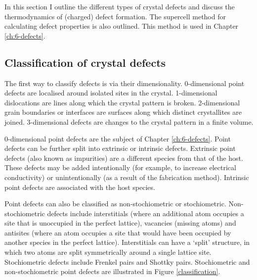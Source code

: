 In this section I outline the different types of crystal defects and discuss the thermodynamics of (charged) defect formation. The supercell method for calculating defect properties is also outlined. This method is used in Chapter \ref{ch:6-defects}.



\subsection{Classification of crystal defects}

The first way to classify defects is via their dimensionality. 0-dimensional point defects are localised around isolated sites in the crystal. 1-dimensional dislocations are lines along which the crystal pattern is broken. 2-dimensional grain boundaries or interfaces are surfaces along which distinct crystallites are joined. 3-dimensional defects are changes to the crystal pattern in a finite volume. 

0-dimensional point defects are the subject of Chapter \ref{ch:6-defects}. Point defects can be further split into extrinsic or intrinsic defects. Extrinsic point defects (also known as impurities) are a different species from that of the host. These defects may be added intentionally (for example, to increase electrical conductivity) or unintentionally (as a result of the fabrication method). Intrinsic point defects are associated with the host species.

Point defects can also be classified as non-stochiometric or stochiometric. Non-stochiometric defects include interstitials (where an additional atom occupies a site that is unoccupied in the perfect lattice), vacancies (missing atoms) and antisites (where an atom occupies a site that would have been occupied by another species in the perfect lattice). Interstitials can have a `split' structure, in which two atoms are split symmetrically around a single lattice site. Stochiometric defects include Frenkel pairs and Shottky pairs. Stochiometric and non-stochiometric point defects are illustrated in Figure \ref{classification}.

